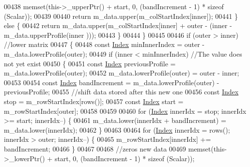 \begin{DoxyCode}
00438                     memset(this->\_upperPtr() + start, 0, (bandIncrement - 1) * \textcolor{keyword}{sizeof} (Scalar));
00439 
00440                     \textcolor{keywordflow}{return} m\_data.upper(m\_colStartIndex[inner]);
00441                 \} \textcolor{keywordflow}{else} \{
00442                     \textcolor{keywordflow}{return} m\_data.upper(m\_colStartIndex[inner] + outer - (inner - m\_data.upperProfile(inner
      )));
00443                 \}
00444             \}
00445 
00446             \textcolor{keywordflow}{if} (outer > inner) \textcolor{comment}{//lower matrix}
00447             \{
00448                 \textcolor{keyword}{const} \hyperlink{group___core___module_a554f30542cc2316add4b1ea0a492ff02}{Index} minInnerIndex = outer - m\_data.lowerProfile(outer);
00449                 \textcolor{keywordflow}{if} (inner < minInnerIndex) \textcolor{comment}{//The value does not yet exist}
00450                 \{
00451                     \textcolor{keyword}{const} \hyperlink{group___core___module_a554f30542cc2316add4b1ea0a492ff02}{Index} previousProfile = m\_data.lowerProfile(outer);
00452                     m\_data.lowerProfile(outer) = outer - inner;
00453 
00454                     \textcolor{keyword}{const} \hyperlink{group___core___module_a554f30542cc2316add4b1ea0a492ff02}{Index} bandIncrement = m\_data.lowerProfile(outer) - previousProfile;
00455                     \textcolor{comment}{//shift data stored after this new one}
00456                     \textcolor{keyword}{const} \hyperlink{group___core___module_a554f30542cc2316add4b1ea0a492ff02}{Index} stop = m\_rowStartIndex[rows()];
00457                     \textcolor{keyword}{const} \hyperlink{group___core___module_a554f30542cc2316add4b1ea0a492ff02}{Index} start = m\_rowStartIndex[outer];
00458 
00459 
00460                     \textcolor{keywordflow}{for} (\hyperlink{group___core___module_a554f30542cc2316add4b1ea0a492ff02}{Index} innerIdx = stop; innerIdx >= start; innerIdx--) \{
00461                         m\_data.lower(innerIdx + bandIncrement) = m\_data.lower(innerIdx);
00462                     \}
00463 
00464                     \textcolor{keywordflow}{for} (\hyperlink{group___core___module_a554f30542cc2316add4b1ea0a492ff02}{Index} innerIdx = rows(); innerIdx > outer; innerIdx--) \{
00465                         m\_rowStartIndex[innerIdx] += bandIncrement;
00466                     \}
00467 
00468                     \textcolor{comment}{//zeros new data}
00469                     memset(this->\_lowerPtr() + start, 0, (bandIncrement - 1) * \textcolor{keyword}{sizeof} (Scalar));

\end{DoxyCode}
